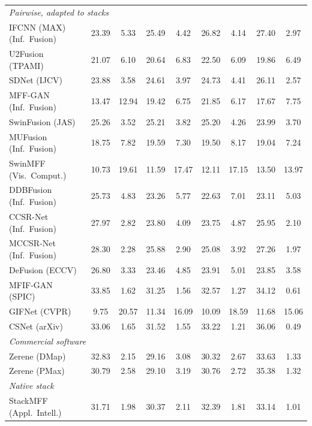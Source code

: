 \begin{table}[!htbp]
\begin{tabular}{lcccccccc}
\multicolumn{9}{l}{\textit{Pairwise, adapted to stacks}} \\
IFCNN (MAX) (Inf.\ Fusion)~\cite{zhang2020ifcnn} & 23.39 & 5.33 & 25.49 & 4.42 & 26.82 & 4.14 & 27.40 & 2.97 \\
U2Fusion (TPAMI)~\cite{xu2020u2fusion} & 21.07 & 6.10 & 20.64 & 6.83 & 22.50 & 6.09 & 19.86 & 6.49 \\
SDNet (IJCV)~\cite{zhang2021sdnet} & 23.88 & 3.58 & 24.61 & 3.97 & 24.73 & 4.41 & 26.11 & 2.57 \\
MFF-GAN (Inf.\ Fusion)~\cite{zhang2021mff} & 13.47 & 12.94 & 19.42 & 6.75 & 21.85 & 6.17 & 17.67 & 7.75 \\
SwinFusion (JAS)~\cite{ma2022swinfusion} & 25.26 & 3.52 & 25.21 & 3.82 & 25.20 & 4.26 & 23.99 & 3.70 \\
MUFusion (Inf.\ Fusion)~\cite{cheng2023mufusion} & 18.75 & 7.82 & 19.59 & 7.30 & 19.50 & 8.17 & 19.04 & 7.24 \\
SwinMFF (Vis.\ Comput.)~\cite{xie2024swinmff} & 10.73 & 19.61 & 11.59 & 17.47 & 12.11 & 17.15 & 13.50 & 13.97 \\
DDBFusion (Inf.\ Fusion)~\cite{zhang2025ddbfusion} & 25.73 & 4.83 & 23.26 & 5.77 & 22.63 & 7.01 & 23.11 & 5.03 \\
CCSR-Net (Inf.\ Fusion)~\cite{ZHENG2025102974} & 27.97 & 2.82 & 23.80 & 4.09 & 23.75 & 4.87 & 25.95 & 2.10 \\
MCCSR-Net (Inf.\ Fusion)~\cite{ZHENG2025102974} & 28.30 & 2.28 & 25.88 & 2.90 & 25.08 & 3.92 & 27.26 & 1.97 \\
DeFusion (ECCV)~\cite{liang2022defusion} & 26.80 & 3.33 & 23.46 & 4.85 & 23.91 & 5.01 & 23.85 & 3.58 \\
MFIF-GAN (SPIC)~\cite{wang2021mfifgan} & 33.85 & 1.62 & 31.25 & 1.56 & 32.57 & 1.27 & 34.12 & 0.61 \\
GIFNet (CVPR)~\cite{cheng2025gifnet} & 9.75 & 20.57 & 11.34 & 16.09 & 10.09 & 18.59 & 11.68 & 15.06 \\
CSNet (arXiv)~\cite{csnet2026} & 33.06 & 1.65 & 31.52 & 1.55 & 33.22 & 1.21 & 36.06 & 0.49 \\
\midrule
\multicolumn{9}{l}{\textit{Commercial software}} \\
Zerene (DMap) & 32.83 & 2.15 & 29.16 & 3.08 & 30.32 & 2.67 & 33.63 & 1.33 \\
Zerene (PMax) & 30.79 & 2.58 & 29.10 & 3.19 & 30.76 & 2.72 & 35.38 & 1.32 \\
\midrule
\multicolumn{9}{l}{\textit{Native stack}} \\
StackMFF (Appl.\ Intell.)~\cite{xie2025stackmff} & 31.71 & 1.98 & 30.37 & 2.11 & 32.39 & 1.81 & 33.14 & 1.01 \\

\end{tabular}
\end{table}
